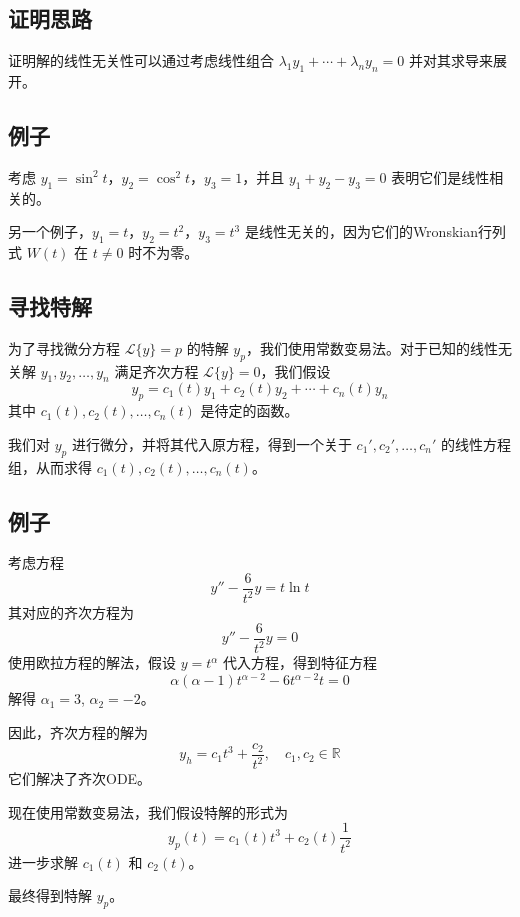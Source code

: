 \documentclass{ctexart}
\begin{document}
\subsection*{证明思路}
证明解的线性无关性可以通过考虑线性组合 \( \lambda_1 y_1 + \cdots + \lambda_n y_n = 0 \) 并对其求导来展开。

\subsection*{例子}
考虑 \( y_1 = \sin^2 t \)，\( y_2 = \cos^2 t \)，\( y_3 = 1 \)，并且 \( y_1 + y_2 - y_3 = 0 \) 表明它们是线性相关的。

另一个例子，\( y_1 = t \)，\( y_2 = t^2 \)，\( y_3 = t^3 \) 是线性无关的，因为它们的Wronskian行列式 \( W(t) \) 在 \( t \neq 0 \) 时不为零。



\subsection*{寻找特解}
为了寻找微分方程 \( \mathcal{L}\{y\} = p \) 的特解 \( y_p \)，我们使用常数变易法。对于已知的线性无关解 \( y_1, y_2, \ldots, y_n \) 满足齐次方程 \( \mathcal{L}\{y\} = 0 \)，我们假设
\[
y_p = c_1(t)y_1 + c_2(t)y_2 + \cdots + c_n(t)y_n
\]
其中 \( c_1(t), c_2(t), \ldots, c_n(t) \) 是待定的函数。

我们对 \( y_p \) 进行微分，并将其代入原方程，得到一个关于 \( c_1', c_2', \ldots, c_n' \) 的线性方程组，从而求得 \( c_1(t), c_2(t), \ldots, c_n(t) \)。

\subsection*{例子}
考虑方程
\[
y'' - \frac{6}{t^2}y = t \ln t
\]
其对应的齐次方程为
\[
y'' - \frac{6}{t^2}y = 0
\]
使用欧拉方程的解法，假设 \( y = t^\alpha \) 代入方程，得到特征方程
\[
\alpha(\alpha-1)t^{\alpha-2} - 6t^{\alpha-2}t = 0
\]
解得 \( \alpha_1 = 3 \), \( \alpha_2 = -2 \)。

因此，齐次方程的解为
\[
y_h = c_1t^3 + \frac{c_2}{t^2}, \quad c_1, c_2 \in \mathbb{R}
\]
它们解决了齐次ODE。

现在使用常数变易法，我们假设特解的形式为
\[
y_p(t) = c_1(t)t^3 + c_2(t)\frac{1}{t^2}
\]
进一步求解 \( c_1(t) \) 和 \( c_2(t) \)。


最终得到特解 \( y_p \)。


\newpage
\date{05.12.2023}
\end{document}
